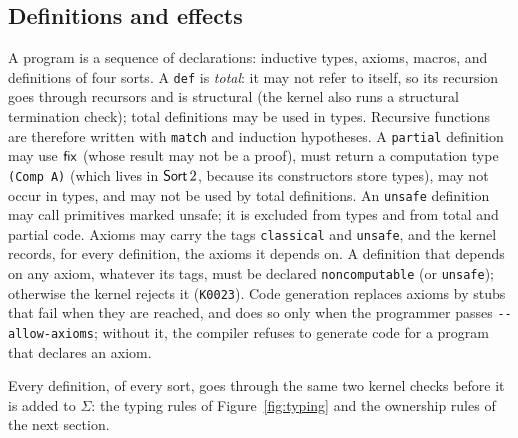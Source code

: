 \subsection{Definitions and effects}\label{sec:core:defs}

A program is a sequence of declarations: inductive types, axioms, macros, and definitions of four sorts.
A \lstinline|def| is \emph{total}: it may not refer to itself, so its recursion goes through recursors and is structural (the kernel also runs a structural termination check); total definitions may be used in types.
Recursive functions are therefore written with \lstinline|match| and induction hypotheses.
A \lstinline|partial| definition may use $\mathsf{fix}$ (whose result may not be a proof), must return a computation type \lstinline|(Comp A)| (which lives in $\mathsf{Sort}\,2$, because its constructors store types), may not occur in types, and may not be used by total definitions.
An \lstinline|unsafe| definition may call primitives marked unsafe; it is excluded from types and from total and partial code.
Axioms may carry the tags \lstinline|classical| and \lstinline|unsafe|, and the kernel records, for every definition, the axioms it depends on.
A definition that depends on any axiom, whatever its tags, must be declared \lstinline|noncomputable| (or \lstinline|unsafe|); otherwise the kernel rejects it (\texttt{K0023}).
Code generation replaces axioms by stubs that fail when they are reached, and does so only when the programmer passes \texttt{-{}-allow-axioms}; without it, the compiler refuses to generate code for a program that declares an axiom.

Every definition, of every sort, goes through the same two kernel checks before it is added to $\Sigma$: the typing rules of Figure~\ref{fig:typing} and the ownership rules of the next section.
